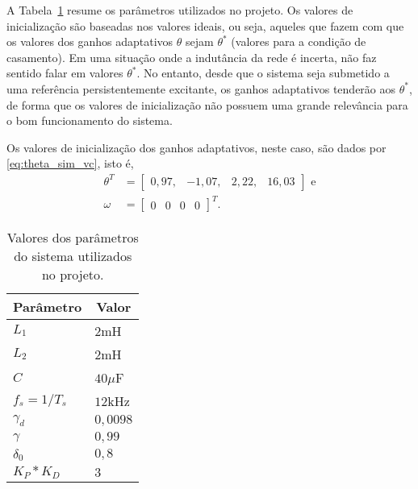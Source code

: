   A Tabela~\ref{tab:parametros_projeto_vc} resume os parâmetros utilizados no projeto. Os valores de inicialização são baseadas nos valores ideais, ou seja, aqueles que fazem com que os valores dos ganhos adaptativos $\theta$ sejam $\theta^*$ (valores para a condição de casamento). Em uma situação onde a indutância da rede é incerta, não faz sentido falar em valores $\theta^*$. No entanto, desde que o sistema seja submetido a uma referência persistentemente excitante, os ganhos adaptativos tenderão aos $\theta^*$, de forma que os valores de inicialização não possuem uma grande relevância para o bom funcionamento do sistema.

  Os valores de inicialização dos ganhos adaptativos, neste caso, são dados por \ref{eq:theta_sim_vc}, isto é,
  \begin{equation}
    \begin{split}
      \theta^T & = \left[ \begin{matrix} 0,97, & -1,07, & 2,22, & 16,03 \end{matrix} \right]\text{ e}\\
      \omega & = {\left[ \begin{matrix} 0 & 0 & 0 & 0 \end{matrix} \right]}^T\text{.}
    \end{split}
    \label{eq:theta_sim_vc}
  \end{equation}

  \begin{table}[htb]
    \renewcommand{\arraystretch}{1.35}
    \setlength{\tabcolsep}{1.2mm}
    \caption{Valores dos parâmetros do sistema utilizados no projeto.}
    \label{tab:parametros_projeto_vc}
    \centering
    \begin{tabular}{l l}
      \hline
      \multicolumn{1}{c}{Parâmetro} & \multicolumn{1}{c}{Valor}\\
      \hline
      $L_1$         & $2$mH    \\
      $L_2$         & $2$mH    \\
      $C$           & $40\mu$F \\
      $f_s = 1/T_s$ & $12$kHz  \\
      $\gamma_d$    & $0,0098$ \\
      $\gamma$      & $0,99$   \\
      $\delta_0$    & $0,8$    \\
      $K_P*K_D$     & $3$      \\
      \hline
    \end{tabular}
  \end{table}

